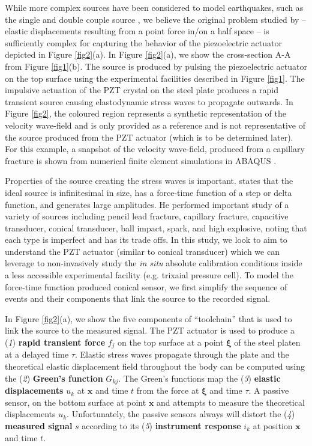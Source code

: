 \documentclass[preprint,3p, 11pt,authoryear]{elsarticle}
\begin{document}
While more complex sources have been considered to model earthquakes, such as the single and double couple source \citet{Sato1972}, we believe the original problem studied by \citet{Lamb1904} -- elastic displacements resulting from a point force in/on a half space -- is sufficiently complex for capturing the behavior of the piezoelectric actuator depicted in Figure \ref{fig2}(a). In Figure \ref{fig2}(a), we show the cross-section A-A from Figure \ref{fig1}(b). The source is produced by pulsing the piezoelectric actuator on the top surface using the experimental facilities described in Figure \ref{fig1}. The impulsive actuation of the PZT crystal on the steel plate produces a rapid transient source causing elastodynamic stress waves to propagate outwards. In Figure \ref{fig2}, the coloured region represents a synthetic representation of the velocity wave-field and is only provided as a reference and is not representative of the source produced from the PZT actuator (which is to be determined later). For this example, a snapshot of the velocity wave-field, produced from a capillary fracture is shown from numerical finite element simulations in ABAQUS \citep[adapted from fig. 2][]{Selvadurai2019}. 

Properties of the source creating the stress waves is important. \citet{Breckenridge1990} states that the ideal source is infinitesimal in size, has a force-time function of a step or delta function, and generates large amplitudes. He performed important study of a variety of sources including pencil lead fracture, capillary fracture, capacitive transducer, conical transducer, ball impact, spark, and high explosive, noting that each type is imperfect and has its trade offs. In this study, we look to aim to understand the PZT actuator (similar to conical transducer) which we can leverage to non-invasively study the \textit{in situ} absolute calibration conditions inside a less accessible experimental facility (e.g. trixaial pressure cell). To model the force-time function produced conical sensor, we first simplify the sequence of events and their components that link the source to the recorded signal.

In Figure \ref{fig2}(a), we show the five components of ``toolchain'' that is used to link the source to the measured signal. The PZT actuator is used to produce a (\textit{1}) \textbf{rapid transient force} $f_{j}$ on the top surface at a point $\mathbf{\xi}$ of the steel platen at a delayed time $\tau$. Elastic stress waves propagate through the plate and the theoretical elastic displacement field throughout the body can be computed using the (\textit{2}) \textbf{Green's function} $G_{kj}$. The Green's functions map the (\textit{3})\textbf{ elastic displacements} $u_{k}$ at $\mathbf{x}$ and time $t$ from the force at $\mathbf{\xi}$ and time $\tau$. A passive sensor, on the bottom surface at point $\mathbf{x}$ and attempts to measure the theoretical displacements $u_{k}$. Unfortunately, the passive sensors always will distort the (\textit{4}) \textbf{measured signal}  $s$ according to its (\textit{5}) \textbf{instrument response} $i_{k}$ at position $\mathbf{x}$ and time $t$. 
\end{document}

